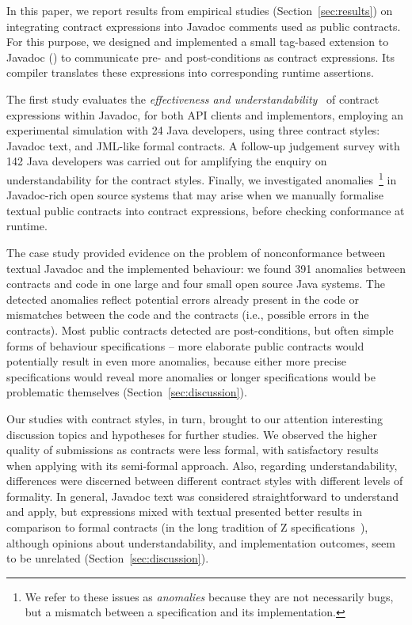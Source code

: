 In this paper, we report results from empirical studies (Section~\ref{sec:results}) on integrating contract expressions into Javadoc comments used as public contracts. 
For this purpose, we designed and implemented a small tag-based extension to Javadoc (\contractjdoc{}) to communicate pre- and post-conditions as contract expressions.
Its compiler translates these expressions into corresponding runtime assertions.

The first study evaluates the \emph{effectiveness and understandability}~\cite{Scalabrino2017} of contract expressions within Javadoc, for both API clients and implementors, employing an experimental simulation with 24 Java developers, using three contract styles: Javadoc text, \contractjdoc{} and JML-like formal contracts. 
A follow-up judgement survey with 142 Java developers was carried out for amplifying the enquiry on understandability for the contract styles. Finally, we investigated anomalies~\footnote{We refer to these issues as \emph{anomalies} because they are not necessarily bugs, but a mismatch between a specification and its implementation.} in Javadoc-rich open source systems that may arise when we manually formalise textual public contracts into contract expressions, before checking conformance at runtime.

The case study provided evidence on the problem of nonconformance between textual Javadoc and the implemented behaviour: we found 391 anomalies between contracts and code in one large and four small open source Java systems. 
The detected anomalies reflect potential errors already present in the code or mismatches between the code and the contracts (i.e., possible errors in the contracts).
Most public contracts detected are post-conditions, but often simple forms of behaviour specifications -- more elaborate public contracts would potentially result in even more anomalies, because either more precise specifications would reveal more anomalies or longer specifications would be problematic themselves (Section~\ref{sec:discussion}).

Our studies with contract styles, in turn, brought to our attention interesting discussion topics and hypotheses for further studies. 
We observed the higher quality of submissions as contracts were less formal, with satisfactory results when applying \contractjdoc{} with its semi-formal approach. Also, regarding understandability, differences were discerned between different contract styles with different levels of formality.
In general, Javadoc text was considered straightforward to understand and apply, but \contractjdoc{} expressions mixed with textual presented better results in comparison to formal contracts (in the long tradition of Z specifications~\cite{zed}), although opinions about understandability, and implementation outcomes, seem to be unrelated (Section~\ref{sec:discussion}).

